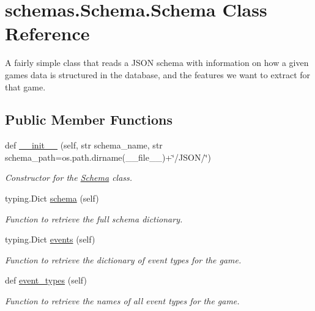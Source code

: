 \hypertarget{classschemas_1_1_schema_1_1_schema}{}\section{schemas.\+Schema.\+Schema Class Reference}
\label{classschemas_1_1_schema_1_1_schema}


A fairly simple class that reads a J\+S\+ON schema with information on how a given game\textquotesingle{}s data is structured in the database, and the features we want to extract for that game.  


\subsection*{Public Member Functions}
\begin{DoxyCompactItemize}
\item 
def \mbox{\hyperlink{classschemas_1_1_schema_1_1_schema_a49117e762b38a7a2a3f7c1a25ab5e38c}{\+\_\+\+\_\+init\+\_\+\+\_\+}} (self, str schema\+\_\+name, str schema\+\_\+path=os.\+path.\+dirname(\+\_\+\+\_\+file\+\_\+\+\_\+)+\char`\"{}/J\+S\+ON/\char`\"{})
\begin{DoxyCompactList}\small\item\em Constructor for the \mbox{\hyperlink{classschemas_1_1_schema_1_1_schema}{Schema}} class. \end{DoxyCompactList}\item 
typing.\+Dict \mbox{\hyperlink{classschemas_1_1_schema_1_1_schema_af9a879ebb04be3449b986010fcbb70f1}{schema}} (self)
\begin{DoxyCompactList}\small\item\em Function to retrieve the full schema dictionary. \end{DoxyCompactList}\item 
typing.\+Dict \mbox{\hyperlink{classschemas_1_1_schema_1_1_schema_abe06b60ef3219404bdae121d8384d580}{events}} (self)
\begin{DoxyCompactList}\small\item\em Function to retrieve the dictionary of event types for the game. \end{DoxyCompactList}\item 
def \mbox{\hyperlink{classschemas_1_1_schema_1_1_schema_a701be4bd6663c1e874002a3006a7a7f4}{event\+\_\+types}} (self)
\begin{DoxyCompactList}\small\item\em Function to retrieve the names of all event types for the game. \end{DoxyCompactList}\item 

\end{DoxyCompactItemize}
